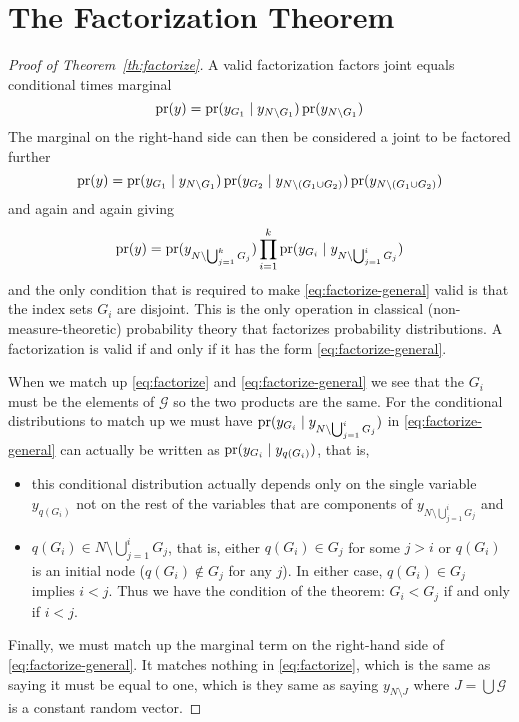 
\chapter{The Factorization Theorem}
\label{app:factorize}

\begin{proof}[Proof of Theorem~\ref{th:factorize}]
A valid factorization factors joint equals conditional times marginal
$$
   \operatorname{pr}(y) = \operatorname{pr}(y_{G_1} \mid y_{N \setminus G_1}) \operatorname{pr}(y_{N \setminus G_1})
$$
The marginal on the right-hand side can then be considered a joint to be
factored further
$$
   \operatorname{pr}(y)
   =
   \operatorname{pr}(y_{G_1} \mid y_{N \setminus G_1})
   \operatorname{pr}(y_{G_2} \mid y_{N \setminus (G_1 \cup G_2)})
   \operatorname{pr}(y_{N \setminus (G_1 \cup G_2)})
$$
and again and again giving
\begin{equation} \label{eq:factorize-general}
   \operatorname{pr}(y)
   =
   \operatorname{pr}(y_{N \setminus \bigcup_{j = 1}^k G_j})
   \prod_{i = 1}^k
   \operatorname{pr}(y_{G_i} \mid y_{N \setminus \bigcup_{j = 1}^i G_j})
\end{equation}
and the only condition that is required to make \eqref{eq:factorize-general}
valid is that the index sets $G_i$ are disjoint.  This is the only operation
in classical (non-measure-theoretic) probability theory that factorizes
probability distributions.  A factorization is valid if and only if it
has the form \eqref{eq:factorize-general}.

When we match up \eqref{eq:factorize} and \eqref{eq:factorize-general}
we see that the $G_i$ must be the elements of $\mathcal{G}$ so the two
products are the same.  For the conditional distributions to
match up we must have $\operatorname{pr}(y_{G_i} \mid y_{N \setminus \bigcup_{j = 1}^i G_j})$
in \eqref{eq:factorize-general} can actually be written as
$\operatorname{pr}(y_{G_i} \mid y_{q(G_i)})$, that is,
\begin{itemize}
\item this conditional distribution actually depends only on the single
    variable $y_{q(G_i)}$ not on the rest of the variables that are components
    of $y_{N \setminus \bigcup_{j = 1}^i G_j}$ and
\item $q(G_i) \in N \setminus \bigcup_{j = 1}^i G_j$, that is, either
    $q(G_i) \in G_j$ for some $j > i$ or $q(G_i)$ is an initial node
    ($q(G_i) \notin G_j$ for any $j$).  In either case,
    $q(G_i) \in G_j$ implies $i < j$.  Thus we have the condition of
    the theorem: $G_i < G_j$ if and only if $i < j$.
\end{itemize}
Finally, we must match up the marginal term on the right-hand side of
\eqref{eq:factorize-general}.  It matches nothing in \eqref{eq:factorize},
which is the same as saying it must be equal to one, which is they same as
saying $y_{N \setminus J}$ where $J = \bigcup \mathcal{G}$ is a constant
random vector.
\end{proof}

